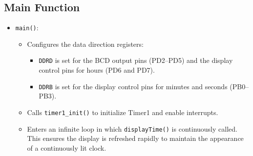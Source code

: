 \documentclass{article}
\theoremstyle{remark}
\begin{document}
\subsection{Main Function}
\begin{itemize}[noitemsep]
    \item \texttt{main()}:
    \begin{itemize}[noitemsep]
        \item Configures the data direction registers:
        \begin{itemize}[noitemsep]
            \item \texttt{DDRD} is set for the BCD output pins (PD2--PD5) and the display control pins for hours (PD6 and PD7).
            \item \texttt{DDRB} is set for the display control pins for minutes and seconds (PB0--PB3).
        \end{itemize}
        \item Calls \texttt{timer1\_init()} to initialize Timer1 and enable interrupts.
        \item Enters an infinite loop in which \texttt{displayTime()} is continuously called. This ensures the display is refreshed rapidly to maintain the appearance of a continuously lit clock.
    \end{itemize}
\end{itemize}
\end{document}

